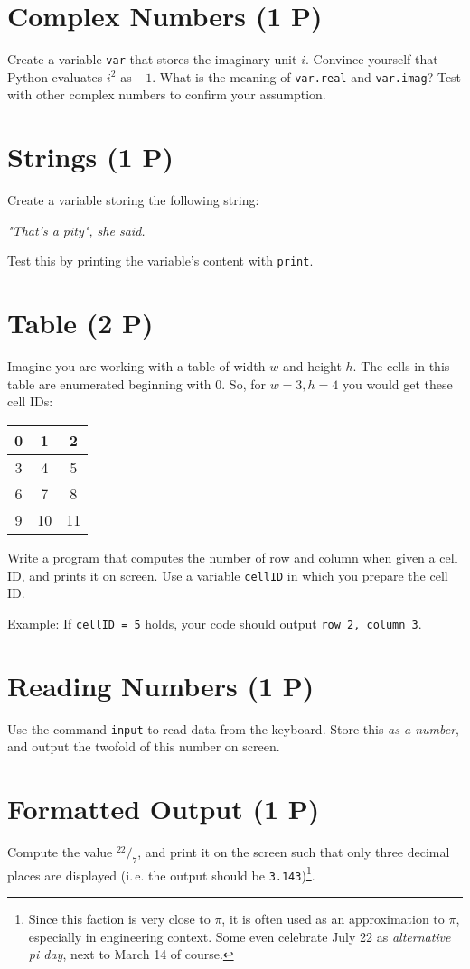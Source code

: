 \documentclass[
	english,
	fontsize=10pt,
	parskip=half,
	titlepage=true,
	DIV=12
]{scrartcl}
\newcommand*{\tabcrlf}{\\ \hline}
\newcommand*{\inPy}[1]{\texttt{#1}}
\newcommand*{\ie}{i.\,e. }
\begin{document}
\section{Complex Numbers (1 P)}
Create a variable \texttt{var} that stores the imaginary unit $i$. Convince yourself that Python evaluates $i^2$ as $-1$. What is the meaning of \texttt{var.real} and \texttt{var.imag}? Test with other complex numbers to confirm your assumption.

\section{Strings (1 P)}
Create a variable storing the following string:
\begin{center}
	\emph{"That's a pity", she said.}
\end{center}

Test this by printing the variable's content with \inPy{print}.

\section{Table (2 P)}
Imagine you are working with a table of width $w$ and height $h$. The cells in this table are enumerated beginning with 0. So, for $w = 3, h = 4$ you would get these cell IDs:
\begin{center}
\begin{tabular}{|c|c|c|}
	\hline
	 0 &  1 &  2 \tabcrlf 
	 3 &  4 &  5 \tabcrlf
	 6 &  7 &  8 \tabcrlf
	 9 & 10 & 11 \tabcrlf
\end{tabular}
\end{center}

Write a program that computes the number of row and column when given a cell ID, and prints it on screen. Use a variable \texttt{cellID} in which you prepare the cell ID.

Example: If \inPy{cellID = 5} holds, your code should output \texttt{row 2, column 3}.

\section{Reading Numbers (1 P)}
Use the command \inPy{input} to read data from the keyboard. Store this \emph{as a number}, and output the twofold of this number on screen.

\section{Formatted Output (1 P)}
Compute the value $^{22}/_{7}$, and print it on the screen such that only three decimal places are displayed (\ie the output should be \texttt{3.143})\footnote{Since this faction is very close to $\pi$, it is often used as an approximation to $\pi$, especially in engineering context. Some even celebrate July 22 as \emph{alternative pi day}, next to March 14 of course.}.
\end{document}
